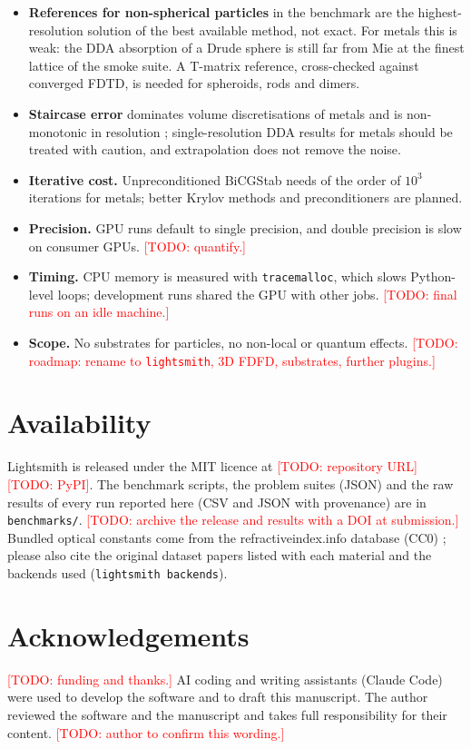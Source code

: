 \documentclass[11pt]{article}
\newcommand{\todo}[1]{\textcolor{red}{[TODO: #1]}}
\newcommand{\code}[1]{\texttt{#1}}
\newcommand{\LS}{Lightsmith}
\begin{document}
\begin{itemize}
  \item \textbf{References for non-spherical particles} in the benchmark are the highest-resolution
  solution of the best available method, not exact. For metals this is weak: the DDA absorption of a
  Drude sphere is still far from Mie at the finest lattice of the smoke suite. A T-matrix reference,
  cross-checked against converged FDTD, is needed for spheroids, rods and dimers.
  \item \textbf{Staircase error} dominates volume discretisations of metals and is non-monotonic in
  resolution \cite{Yurkin2010gold}; single-resolution DDA results for metals should be treated with
  caution, and extrapolation \cite{Yurkin2006extrap} does not remove the noise.
  \item \textbf{Iterative cost.} Unpreconditioned BiCGStab needs of the order of $10^3$ iterations for
  metals; better Krylov methods and preconditioners are planned.
  \item \textbf{Precision.} GPU runs default to single precision, and double precision is slow on
  consumer GPUs. \todo{quantify.}
  \item \textbf{Timing.} CPU memory is measured with \code{tracemalloc}, which slows Python-level loops;
  development runs shared the GPU with other jobs. \todo{final runs on an idle machine.}
  \item \textbf{Scope.} No substrates for particles, no non-local or quantum effects. \todo{roadmap:
  rename to \code{lightsmith}, 3D FDFD, substrates, further plugins.}
\end{itemize}

\section{Availability}
\label{sec:availability}
\LS{} is released under the MIT licence at \todo{repository URL} \todo{PyPI}. The benchmark
scripts, the problem suites (JSON) and the raw results of every run reported here (CSV and JSON with
provenance) are in \code{benchmarks/}. \todo{archive the release and results with a DOI at
submission.} Bundled optical constants come from the refractiveindex.info database (CC0)
\cite{Polyanskiy2024}; please also cite the original dataset papers listed with each material and the
backends used (\code{lightsmith backends}).

\section*{Acknowledgements}
\todo{funding and thanks.}
AI coding and writing assistants (Claude Code) were used to develop the software and to draft this
manuscript. The author reviewed the software and the manuscript and takes full responsibility for
their content. \todo{author to confirm this wording.}



\end{document}
